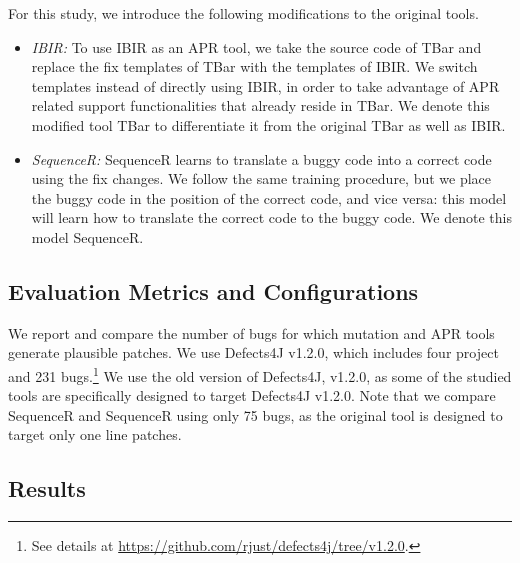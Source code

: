 \documentclass[conference]{IEEEtran}
\def\d4j{Defects4J\xspace}
\newcommand\inv[1]{#1\raisebox{1.15ex}{$\scriptscriptstyle-\!1$}}
\begin{document}
For this study, we introduce the following modifications to the original tools.
\begin{itemize}
\item \textit{IBIR:} To use IBIR as an APR tool, we take the source code of 
TBar and replace the fix templates of TBar with the templates of IBIR. We 
switch templates instead of directly using IBIR, in order to take advantage of 
APR related support functionalities that already reside in TBar. We denote this 
modified tool \inv{TBar} to differentiate it from the original TBar as well 
as IBIR.

\item \textit{SequenceR:} SequenceR learns to translate a buggy code into a 
correct code using the fix changes. We follow the same training procedure, but 
we place the buggy code in the position of the correct code, and vice versa: 
this model will learn how to translate the correct code to the buggy code. We 
denote this model \inv{SequenceR}. 
\end{itemize}


\subsection{Evaluation Metrics and Configurations}
\label{sec:RQ2_metric}

We report and compare the number of bugs for which mutation and APR tools
generate plausible patches. We use \d4j v1.2.0, which includes four project and
231 bugs.\footnote{See details at
\url{https://github.com/rjust/defects4j/tree/v1.2.0}.} We use the old version of
\d4j, v1.2.0, as some of the studied tools are specifically designed to target
\d4j v1.2.0. Note that we compare SequenceR and \inv{SequenceR} using only 75
bugs, as the original tool is designed to target only one line patches. 


\subsection{Results}
\label{sec:RQ2_results}
\end{document}
